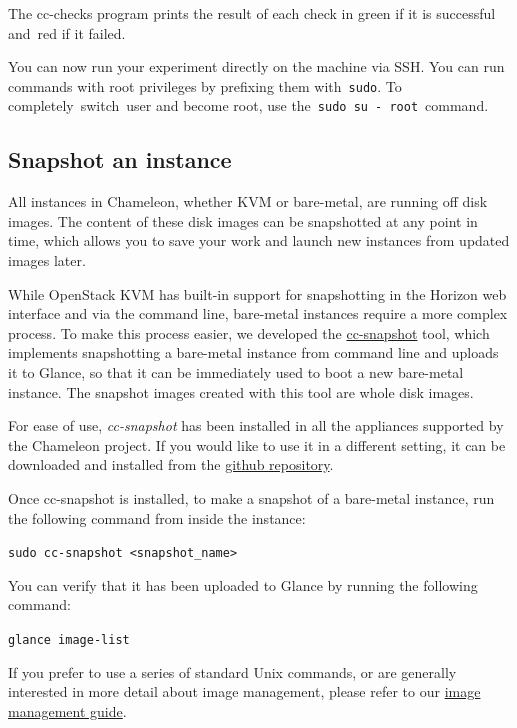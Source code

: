 The cc-checks program prints the result of each check in green if it is
successful and~red if it failed.

You can now run your experiment directly on the machine via SSH. You can
run commands with root privileges by prefixing them with~\texttt{sudo}.
To completely~switch~user and become root, use
the~\texttt{sudo\ su\ -\ root}~command.

\subsection{\texorpdfstring{{Snapshot an
instance}}{Snapshot an instance}}\label{snapshot-an-instance}

All instances in Chameleon, whether KVM or bare-metal, are running off
disk images. The content of these disk images can be snapshotted at any
point in time, which allows you to save your work and launch new
instances from updated images later.

While OpenStack KVM has built-in support for snapshotting in the Horizon
web interface and via the command line, bare-metal instances require a
more complex process. To make this process easier,{ we developed the
\href{https://github.com/ChameleonCloud/ChameleonSnapshotting}{cc-snapshot}
tool, which implements snapshotting a bare-metal instance from command
line and uploads it to Glance, so that it can be immediately used to
boot a new bare-metal instance. The snapshot images created with this
tool are whole disk images.}

{For ease of use, \emph{cc-snapshot} has been installed in all the
appliances supported by the Chameleon project. If you would like to use
it in a different setting, it can be downloaded and installed from the
\href{https://github.com/ChameleonCloud/ChameleonSnapshotting}{github
repository}.}

{Once cc-snapshot is installed, to make a snapshot of a bare-metal
instance, run the following command from inside the instance:}

{\texttt{sudo\ cc-snapshot\ \textless{}snapshot\_name\textgreater{}}}

{You can verify that it has been uploaded to Glance by running the
following command:}

{\texttt{glance\ image-list}}

{If you prefer to use a series of standard Unix commands, or are
generally interested in more detail about image management, please refer
to our
\href{https://www.chameleoncloud.org/docs/user-guides/ironic/\#snapshotting_an_instance}{image
management guide}.}

